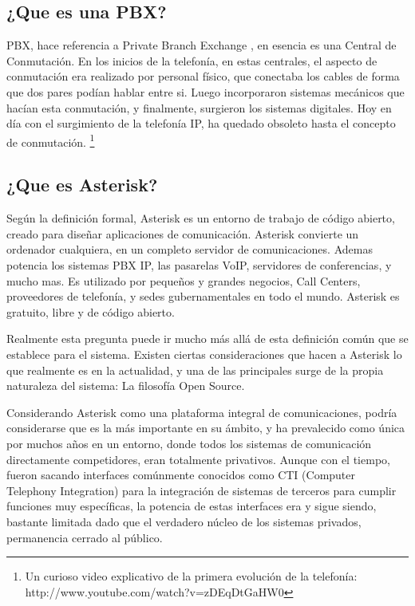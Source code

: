 \subsection{¿Que es una PBX?}

PBX, hace referencia a Private Branch Exchange \cite{website:pbx}, en esencia es una Central de Conmutación. En los inicios de la telefonía, en estas centrales, el aspecto de conmutación era realizado por personal físico, que conectaba los cables de forma que dos pares podían hablar entre si. Luego incorporaron sistemas mecánicos que hacían esta conmutación, y finalmente, surgieron los sistemas digitales. Hoy en día con el surgimiento de la telefonía IP, ha quedado obsoleto hasta el concepto de conmutación. \footnote{Un curioso video explicativo de la primera evolución de la telefonía: http://www.youtube.com/watch?v=zDEqDtGaHW0}

\subsection{¿Que es Asterisk?}

Según la definición formal, Asterisk es un entorno de trabajo de código abierto, creado para diseñar aplicaciones de comunicación. Asterisk convierte un ordenador cualquiera, en un completo servidor de comunicaciones. Ademas potencia los sistemas PBX IP, las pasarelas VoIP, servidores de conferencias, y mucho mas. Es utilizado por pequeños y grandes negocios, Call Centers, proveedores de telefonía, y sedes gubernamentales en todo el mundo. Asterisk es gratuito, libre y de código abierto.

Realmente esta pregunta puede ir mucho más allá de esta definición común que se establece para el sistema. Existen ciertas consideraciones que hacen a Asterisk lo que realmente es en la actualidad, y una de las principales surge de la propia naturaleza del sistema: La filosofía Open Source.

Considerando Asterisk como una plataforma integral de comunicaciones, podría considerarse que es la más importante en su ámbito, y ha prevalecido como única por muchos años en un entorno, donde todos los sistemas de comunicación directamente competidores, eran totalmente privativos. Aunque con el tiempo, fueron sacando interfaces comúnmente conocidos como CTI (Computer Telephony Integration) para la integración de sistemas de terceros para cumplir funciones muy específicas, la potencia de estas interfaces era y sigue siendo, bastante limitada dado que el verdadero núcleo de los sistemas privados, permanencia cerrado al público.

